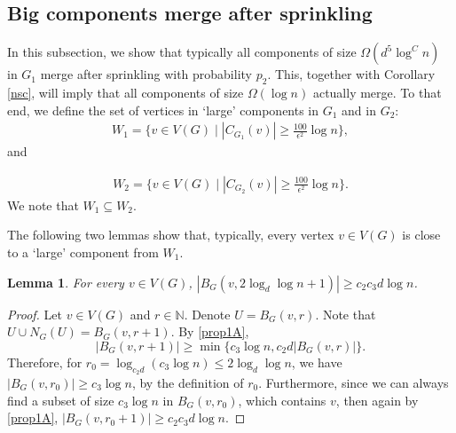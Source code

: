 \documentclass[notitlepage]{scrartcl}
\newtheorem{lemma}[thm]{Lemma}
\begin{document}
\subsection{Big components merge after sprinkling}\label{need p2}

In this subsection, we show that typically all components of size $\Omega(d^5\log^C n)$ in $G_1$ merge after sprinkling with probability $p_2$. This, together with Corollary \ref{nsc}, will imply that all components of size $\Omega(\log n)$ actually merge. To that end, we define the set of vertices in ‘large’ components in $G_1$ and in $G_2$:
\begin{align*}
    W_1=\bigg\{v\in V(G)\;\bigg|\; |C_{G_1}(v)|\geq \frac{100}{\epsilon^2}\log n\bigg\},
\end{align*}
and

\begin{align*}
    W_2=\bigg\{v\in V(G)\;\bigg|\; |C_{G_2}(v)|\geq \frac{100}{\epsilon^2}\log n\bigg\}.
\end{align*}
We note that $W_1\subseteq W_2$.

The following two lemmas show that, typically, every vertex $v\in V(G)$ is close to a `large' component from $W_1$.

\begin{lemma} \label{dist_2}
    For every $v\in V(G)$, $|B_G(v,2\log_d\log n+1)|\geq c_2c_3d\log n$.
\end{lemma}

\begin{proof}
    Let $v\in V(G)$ and $r\in \mathbb{N}$. Denote $U=B_G(v,r)$. Note that $U\cup N_G(U)=B_G(v,r+1)$. 
    By \ref{prop1A}, $$|B_G(v,r+1)|\geq \min \Bigg\{c_3\log n, c_2d|B_G(v,r)|\Bigg\}.$$
    Therefore, for $r_0=\log_{c_2d}(c_3\log n)\leq 2\log_d\log n$, we have $|B_G(v,r_0)|\geq c_3\log n$, by the definition of $r_0$. Furthermore, since we can always find a subset of size $c_3\log n$ in $B_G(v,r_0)$, which contains $v$, then again by \ref{prop1A}, $|B_G(v,r_0+1)|\ge c_2c_3d\log n$.
\end{proof}
\end{document}
